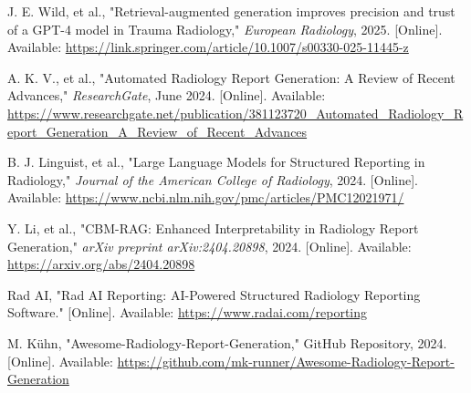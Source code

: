 \begin{thebibliography}{99}
J. E. Wild, et al., "Retrieval-augmented generation improves precision and trust of a GPT-4 model in Trauma Radiology," \textit{European Radiology}, 2025. [Online]. Available: \url{https://link.springer.com/article/10.1007/s00330-025-11445-z}

A. K. V., et al., "Automated Radiology Report Generation: A Review of Recent Advances," \textit{ResearchGate}, June 2024. [Online]. Available: \url{https://www.researchgate.net/publication/381123720_Automated_Radiology_Report_Generation_A_Review_of_Recent_Advances}

B. J. Linguist, et al., "Large Language Models for Structured Reporting in Radiology," \textit{Journal of the American College of Radiology}, 2024. [Online]. Available: \url{https://www.ncbi.nlm.nih.gov/pmc/articles/PMC12021971/}

Y. Li, et al., "CBM-RAG: Enhanced Interpretability in Radiology Report Generation," \textit{arXiv preprint arXiv:2404.20898}, 2024. [Online]. Available: \url{https://arxiv.org/abs/2404.20898}

Rad AI, "Rad AI Reporting: AI-Powered Structured Radiology Reporting Software." [Online]. Available: \url{https://www.radai.com/reporting}

M. Kühn, "Awesome-Radiology-Report-Generation," GitHub Repository, 2024. [Online]. Available: \url{https://github.com/mk-runner/Awesome-Radiology-Report-Generation}

\end{thebibliography} 